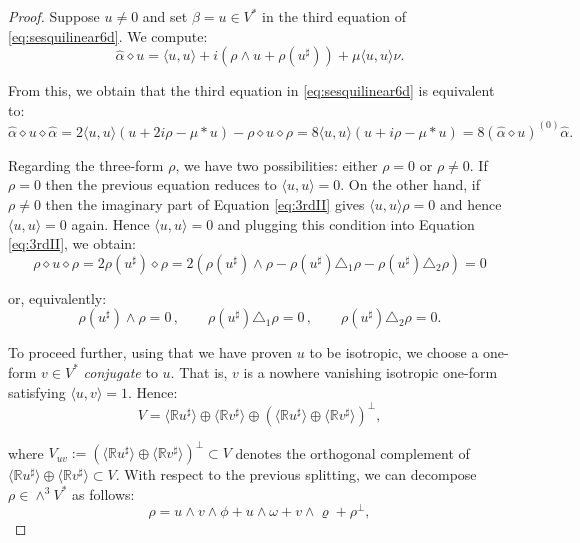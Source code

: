 \documentclass[10pt,a4paper,twoside,reqno]{amsart}
\theoremstyle{plain}
\theoremstyle{definition}
\theoremstyle{remark}
\newcommand{\escal}[1]{\langle#1\rangle}
\begin{document}
\begin{proof}
Suppose $u\neq 0$ and set $\beta = u\in V^*$ in the third equation of \eqref{eq:sesquilinear6d}. We compute:
\begin{equation*}
\widehat{\alpha}\diamond u=\escal{u,u}+i(\rho\wedge u+\rho(u^\sharp))+\mu\escal{u,u}\nu.
\end{equation*}

\noindent
From this, we obtain that the third equation in \eqref{eq:sesquilinear6d} is equivalent to:
\begin{equation}
\label{eq:3rdII}
\widehat{\alpha}\diamond u\diamond\widehat{\alpha}=2\escal{u,u}(u+2i\rho-\mu*u)-\rho\diamond u\diamond\rho=8\escal{u,u}(u + i \rho  - \mu \ast u)=8 (\widehat{\alpha}\diamond u)^{(0)}\widehat{\alpha}.
\end{equation}

\noindent
Regarding the three-form $\rho$, we have two possibilities: either $\rho = 0$ or $\rho \neq 0$. If $\rho = 0$ then the previous equation reduces to $\escal{u,u} = 0$. On the other hand, if $\rho\neq  0$ then the imaginary part of Equation \eqref{eq:3rdII} gives $\escal{u,u}\rho = 0$ and hence $\escal{u,u} = 0$ again. Hence $\escal{u,u} = 0$ and plugging this condition into Equation \eqref{eq:3rdII}, we obtain:
\begin{equation*}
\rho \diamond u\diamond \rho   =  2 \rho(u^\sharp) \diamond \rho = 2 (\rho(u^\sharp) \wedge \rho - \rho(u^\sharp) \triangle_1 \rho - \rho(u^\sharp) \triangle_2 \rho) = 0
\end{equation*}
 
\noindent
or, equivalently:
\begin{equation*}
\rho(u^\sharp) \wedge \rho  = 0\, , \qquad  \rho(u^\sharp) \triangle_1 \rho = 0\, , \qquad  \rho(u^\sharp) \triangle_2 \rho = 0.
\end{equation*}

\noindent
To proceed further, using that we have proven $u$ to be isotropic,  we choose a one-form $v\in V^*$ \emph{conjugate} to $u$. That is, $v$ is a nowhere vanishing isotropic one-form satisfying $\langle u , v \rangle = 1$. Hence:
\begin{equation*}
V  = \langle \mathbb{R} u^{\sharp} \rangle \oplus \langle \mathbb{R} v^{\sharp} \rangle \oplus (\langle \mathbb{R} u^{\sharp} \rangle \oplus \langle \mathbb{R} v^{\sharp} \rangle)^{\perp},
\end{equation*}

\noindent
where $V_{uv}:=(\langle \mathbb{R} u^{\sharp} \rangle \oplus \langle \mathbb{R} v^{\sharp} \rangle)^{\perp} \subset V$ denotes the orthogonal complement of $\langle \mathbb{R} u^{\sharp} \rangle \oplus \langle \mathbb{R} v^{\sharp} \rangle \subset V$. With respect to the previous splitting, we can decompose $\rho\in\wedge^3V^*$ as follows:
\begin{equation*}
\rho=u\wedge v\wedge\phi+u\wedge\omega+v\wedge\varrho+\rho^\perp,
\end{equation*}


\end{proof}
\end{document}
